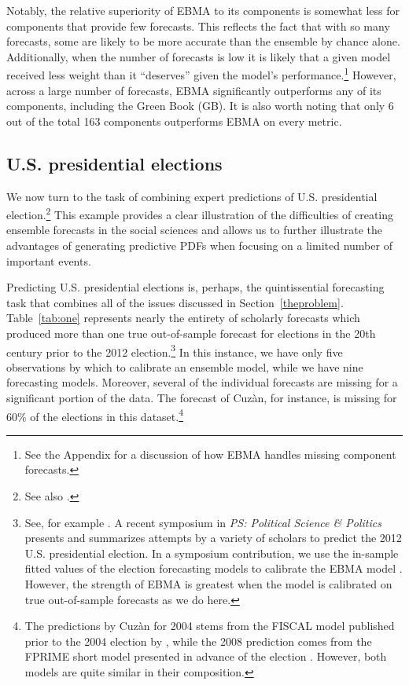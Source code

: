 \documentclass[12pt,fullpage,endnotes]{article}
\begin{document}
Notably, the relative superiority of EBMA to its components is
somewhat less for components that provide few forecasts.  This
reflects the fact that with so many forecasts, some are likely to be
more accurate than the ensemble by chance alone. Additionally, when
the number of forecasts is low it is likely that a given model
received less weight than it ``deserves'' given the model's
performance.\footnote{See the Appendix for a discussion of how EBMA
  handles missing component forecasts.}  However, across a large
  number of forecasts, EBMA significantly outperforms any of its
  components, including the Green Book (GB).  It is also worth noting
  that only 6 out of the total 163 components outperforms EBMA on
  every metric.




\subsection{U.S. presidential elections}

We now turn to the task of combining expert predictions of
U.S. presidential election.\footnote{See also \citep{Montgomery:2012c}.}
This example provides a clear illustration of the difficulties of
creating ensemble forecasts in the social sciences and allows us to
further illustrate the advantages of generating predictive PDFs when
focusing on a limited number of important events.

Predicting U.S. presidential elections is, perhaps, the quintissential
forecasting task that combines all of the issues discussed in
Section~\ref{theproblem}.  Table~\ref{tab:one} represents nearly the
entirety of scholarly forecasts which produced more than one true
out-of-sample forecast for elections in the 20th century prior to the
2012 election.\footnote{ See, for example \citet[][]{Fair:2009,
    Fair2011, Abramowitz:2008, Campbell:2008,
    Cuzan:2004,Cuzan:Bundrick:2008,hibbs:2012, Lockerbie:2008,
    Erikson:Wlezien:2008, Graefe:2010, Holbrook:2008}.  A recent
  symposium in {\em PS: Political Science \& Politics} presents and
  summarizes attempts by a variety of scholars to predict the 2012
  U.S. presidential election. In a symposium contribution, we use the
  in-sample fitted values of the election forecasting models to
  calibrate the EBMA model \citep{Montgomery:2012c}. However, the
  strength of EBMA is greatest when the model is calibrated on true
  out-of-sample forecasts as we do here.}  In this instance, we have
only five observations by which to calibrate an ensemble model, while
we have nine forecasting models.  Moreover, several of the individual
forecasts are missing for a significant portion of the data.  The
forecast of Cuz\`an, for instance, is missing for 60\% of the
elections in this dataset.\footnote{The predictions by Cuz\`an for
  2004 stems from the FISCAL model published prior to the 2004
  election by \citet{Cuzan:2004}, while the 2008 prediction comes from
  the FPRIME short model presented in advance of the election
  \citep{Cuzan:Bundrick:2008}. However, both models are quite similar
  in their composition.}
\end{document}
